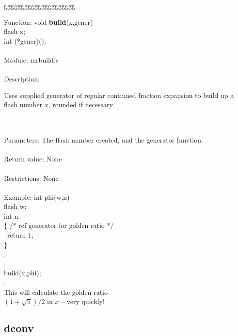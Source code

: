 \begin{tabbing}
ggggggggggggggggggggg\= \kill

      Function:      \>void {\bf build}(x,gener) \\
                     \>flash x;       \\
                     \>int (*gener)();\\
      \ \\
      Module:        \>mrbuild.c  \\
      \ \\
      Description:    \>
                      \parbox[t]{3in}
                      {Uses supplied generator of regular continued fraction
                       expansion to build up a flash number $x$, rounded if 
                       necessary.}\\
      \ \\
      Parameters:    \>The flash number created, and the generator function. \\
      \ \\
      Return value:  \>None  \\
      \ \\
      Restrictions:  \>None   \\
      \ \\
      Example:       \>int phi(w,n)   \\
                     \>flash w;       \\
                     \>int n;         \\
                     \>\{ /* rcf generator for golden ratio */       \\
                     \> \    return 1;  \\
                     \>\}               \\
                     \>.\\
                     \>.\\
                     \>build(x,phi); \\
                     \>.\\
                     \>This will calculate the golden ratio   \\
                     \>$(1+\sqrt{5})/2$ in $x$ -- very quickly! \\
\end{tabbing}
\pagebreak
\subsection{dconv}

